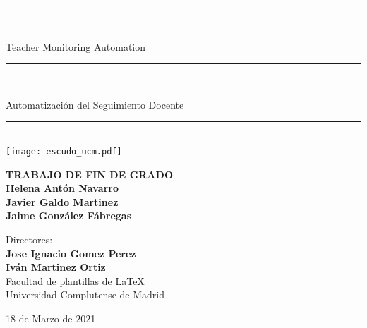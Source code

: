 \begin{titlepage}
	\thispagestyle{empty}

	\begin{center}

		\vspace{1cm}

		\vspace{0.65cm}
		\rule{2in}{0.5pt}\\
		\vspace{0.85cm}

		{\Large Teacher Monitoring Automation}\\

		\vspace{0.65cm}
		\rule{2in}{0.5pt}\\
		\vspace{0.85cm}

		{\Large Automatización del Seguimiento Docente}\\

		\vspace{0.65cm}
		\rule{2in}{0.5pt}\\



		\vfill
		\texttt{[image: escudo\_ucm.pdf]}
		\vfill

		

		\textbf{TRABAJO DE FIN DE GRADO}\\
		\vspace{0.7cm}
		\textbf{Helena Antón Navarro}\\
		\textbf{Javier Galdo Martinez}\\
		\textbf{Jaime González Fábregas}\\

		\vspace{1cm}

		Directores:\\
		\textbf{Jose Ignacio Gomez Perez}\\
		\textbf{Iván Martinez Ortiz}\\

		\vspace{1.8cm}
		Facultad de plantillas de \LaTeX\\
		Universidad Complutense de Madrid
		\vspace{0.5cm}
	   
		18 de Marzo de 2021

		\vspace{0.2cm}

	\end{center}
\end{titlepage}